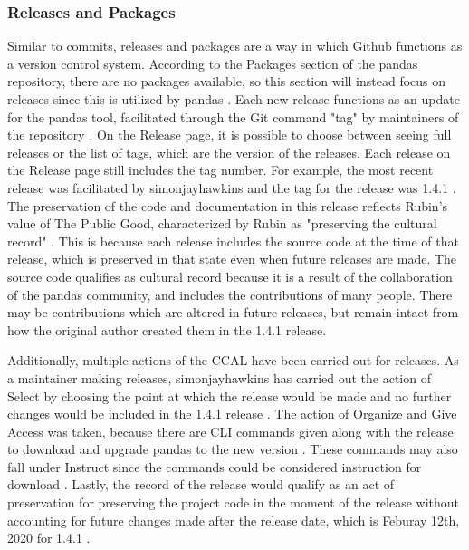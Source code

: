\subsubsection{Releases and Packages}

Similar to commits, releases and packages are a way in which Github functions as a version control system. According to the Packages section of the pandas repository, there are no packages available, so this section will instead focus on releases since this is utilized by pandas \cite{pandasrepo}. Each new release functions as an update for the pandas tool, facilitated through the Git command "tag" by maintainers of the repository \cite{gitdocs}. On the Release page, it is possible to choose between seeing full releases or the list of tags, which are the version of the releases. Each release on the Release page still includes the tag number. For example, the most recent release was facilitated by simonjayhawkins and the tag for the release was 1.4.1 \cite{pandasrepo}. The preservation of the code and documentation in this release reflects Rubin's value of The Public Good, characterized by Rubin as "preserving the cultural record" \cite{rubin2016foundationslis}. This is because each release includes the source code at the time of that release, which is preserved in that state even when future releases are made. The source code qualifies as cultural record because it is a result of the collaboration of the pandas community, and includes the contributions of many people. There may be contributions which are altered in future releases, but remain intact from how the original author created them in the 1.4.1 release. 

Additionally, multiple actions of the CCAL have been carried out for releases. As a maintainer making releases, simonjayhawkins has carried out the action of Select by choosing the point at which the release would be made and no further changes would be included in the 1.4.1 release \cite{gorman2000values}\cite{rubin2016foundationslis}. The action of Organize and Give Access was taken, because there are CLI commands given along with the release to download and upgrade pandas to the new version \cite{gorman2000values}. These commands may also fall under Instruct since the commands could be considered instruction for download \cite{gorman2000values}. Lastly, the record of the release would qualify as an act of preservation for preserving the project code in the moment of the release without accounting for future changes made after the release date, which is Feburay 12th, 2020 for 1.4.1 \cite{rubin2016foundationslis}\cite{pandasrepo}.

